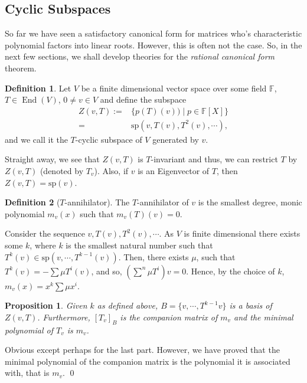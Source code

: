 \documentclass[
]{article}
\newtheorem{prop}{Proposition}[section]
\theoremstyle{definition}
\newtheorem{definition}{Definition}[section]
\begin{document}
\hypertarget{cyclic-subspaces}{%
\subsection{Cyclic Subspaces}\label{cyclic-subspaces}}

So far we have seen a satisfactory canonical form for matrices who's
characteristic polynomial factors into linear roots. However, this is
often not the case. So, in the next few sections, we shall develop
theories for the \emph{rational canonical form} theorem.

\begin{definition}
  Let \(V\) be a finite dimensional vector space over some field \(\mathbb{F}\), 
  \(T \in \mathop{\mathrm{End}}(V)\), \(0 \neq v \in V\) and define the subspace
  \begin{align*}
    Z(v, T) := & \{p(T)(v)) \mid p \in \mathbb{F}[X]\} \\
      = & \text{sp}(v, T(v), T^2(v), \cdots),
  \end{align*}
  and we call it the  \(T\)-cyclic subspace of \(V\) generated by \(v\).
\end{definition}

Straight away, we see that \(Z(v, T)\) is \(T\)-invariant and thus, we
can restrict \(T\) by \(Z(v, T)\) (denoted by \(T_v\)). Also, if \(v\)
is an Eigenvector of \(T\), then \(Z(v, T) = \text{sp}(v)\).

\begin{definition}[\(T\)-annihilator]
  The \(T\)-annihilator of \(v\) is the smallest degree, monic polynomial \(m_v(x)\) 
  such that \(m_v(T)(v) = 0\).
\end{definition}

Consider the sequence \(v, T(v), T^2(v), \cdots\). As \(V\) is finite
dimensional there exists some \(k\), where \(k\) is the smallest natural
number such that \(T^k(v) \in \text{sp}(v, \cdots, T^{k - 1}(v))\).
Then, there exists \(\mu\), such that \(T^k(v) = - \sum \mu T^i(v)\),
and so, \((\sum^n \mu T^i)v = 0\). Hence, by the choice of \(k\),
\(m_v(x) = x^k \sum \mu x^i\).

\begin{prop}
  Given \(k\) as defined above, \(B = \{v, \cdots, T^{k - 1}v\}\) is a basis 
  of \(Z(v, T)\). Furthermore, \([T_v]_B\) is the companion matrix of \(m_v\) and 
  the minimal polynomial of \(T_v\) is \(m_v\).
\end{prop}
\proof

Obvious except perhaps for the last part. However, we have proved that
the minimal polynomial of the companion matrix is the polynomial it is
associated with, that is \(m_v\). \qed
\end{document}
